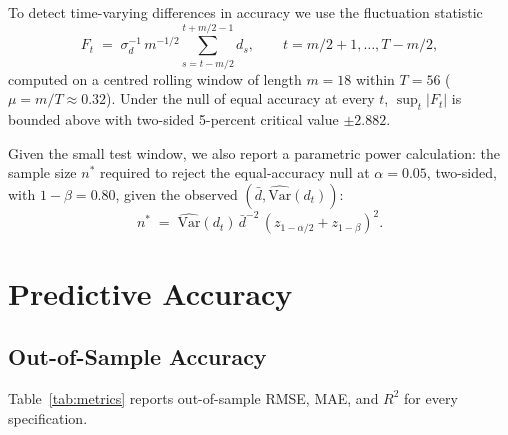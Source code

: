 \documentclass[AER]{AEA}
\begin{document}
To detect time-varying differences in accuracy we use the
\citet{giacomini2010forecast} fluctuation statistic
\begin{equation}
F_t \;=\; \sigma_d^{-1}\,m^{-1/2}\sum_{s=t-m/2}^{t+m/2-1}\!d_s, \qquad
t=m/2+1,\dots,T-m/2,
\label{eq:fluc}
\end{equation}
computed on a centred rolling window of length $m=18$ within $T=56$
($\mu = m/T \approx 0.32$). Under the null of equal accuracy at every $t$,
$\sup_t |F_t|$ is bounded above with two-sided 5-percent critical value
$\pm 2.882$.

Given the small test window, we also report a parametric power calculation:
the sample size $n^{*}$ required to reject the equal-accuracy null at
$\alpha=0.05$, two-sided, with $1-\beta=0.80$, given the observed
$(\bar{d},\widehat{\mathrm{Var}}(d_t))$:
\begin{equation}
n^{*} \;=\; \widehat{\mathrm{Var}}(d_t)\,\bar{d}^{-2}\,
(z_{1-\alpha/2}+z_{1-\beta})^2.
\label{eq:power}
\end{equation}

\section{Predictive Accuracy}\label{sec:results}

\subsection{Out-of-Sample Accuracy}
Table~\ref{tab:metrics} reports out-of-sample RMSE, MAE, and $R^2$ for
every specification.
\end{document}

